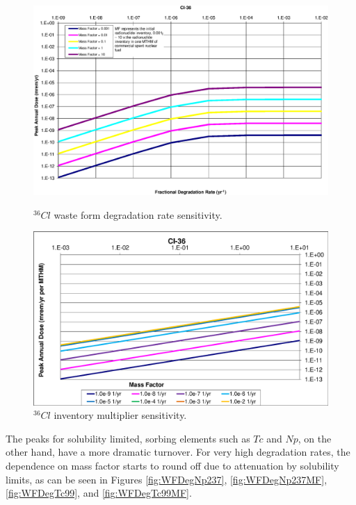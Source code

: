 \begin{figure}[ht]
\begin{minipage}[b]{0.45\linewidth}

\includegraphics[width=\linewidth]{./chapters/nuclide_sensitivity/clay/WFDegAndInv/Cl-36.eps}
\caption{$^{36}Cl$ waste form degradation rate sensitivity.}
\label{fig:WFDegCl36}

\end{minipage}
\hspace{0.05\linewidth}
\begin{minipage}[b]{0.45\linewidth}

\includegraphics[width=\linewidth]{./chapters/nuclide_sensitivity/clay/WFDegAndInv/Cl-36-MF.eps}
\caption{$^{36}Cl$ inventory multiplier sensitivity.}
\label{fig:WFDegCl36MF}
\end{minipage}
\end{figure}

The peaks for solubility limited, sorbing elements such as $Tc$ and $Np$, on the 
other hand, have a more dramatic turnover.  For very high degradation rates, the 
dependence on mass factor starts to round off due to attenuation by solubility 
limits, as can be seen in Figures \ref{fig:WFDegNp237}, \ref{fig:WFDegNp237MF}, 
\ref{fig:WFDegTc99}, and \ref{fig:WFDegTc99MF}.

